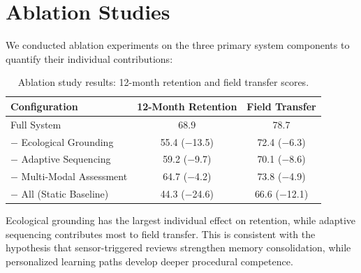 \section{Ablation Studies}

\label{sec:ablation}

We conducted ablation experiments on the three primary system components to quantify their individual contributions:

\begin{table}[H]
\centering
\caption{Ablation study results: 12-month retention and field transfer scores.}
\label{tab:ablation}
\begin{tabular}{@{}lcc@{}}
\toprule
\textbf{Configuration} & \textbf{12-Month Retention} & \textbf{Field Transfer} \\
\midrule
Full System & 68.9 & 78.7 \\
$-$ Ecological Grounding & 55.4 ($-$13.5) & 72.4 ($-$6.3) \\
$-$ Adaptive Sequencing & 59.2 ($-$9.7) & 70.1 ($-$8.6) \\
$-$ Multi-Modal Assessment & 64.7 ($-$4.2) & 73.8 ($-$4.9) \\
$-$ All (Static Baseline) & 44.3 ($-$24.6) & 66.6 ($-$12.1) \\
\bottomrule
\end{tabular}
\end{table}

Ecological grounding has the largest individual effect on retention, while adaptive sequencing contributes most to field transfer.
This is consistent with the hypothesis that sensor-triggered reviews strengthen memory consolidation, while personalized learning paths develop deeper procedural competence.

